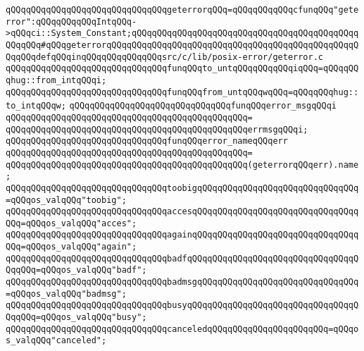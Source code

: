 \verb|qQQqqQQqqQQqqQQqqQQqqQQqqQQqqQQqgeterrorqQQq=qQQqqQQqqQQqcfunqQQq"geterror":qQQqqQQqqQQqIntqQQq->qQQqci::System_Constant;qQQqqQQqqQQqqQQqqQQqqQQqqQQqqQQqqQQqqQQqqQQqqQQqqQQq#qQQqgeterrorqQQqqQQqqQQqqQQqqQQqqQQqqQQqqQQqqQQqqQQqqQQqqQQqqQQqqQQqdefqQQqinqQQqqQQqqQQqqQQqsrc/c/lib/posix-error/geterror.c|\newline
\newline
\verb|qQQqqQQqqQQqqQQqqQQqqQQqqQQqqQQqfunqQQqto_untqQQqqQQqqQQqiqQQq=qQQqqQQqhug::from_intqQQqi;|\newline
\verb|qQQqqQQqqQQqqQQqqQQqqQQqqQQqqQQqfunqQQqfrom_untqQQqwqQQq=qQQqqQQqhug::to_intqQQqw;|\newline
\newline
\newline
\verb|qQQqqQQqqQQqqQQqqQQqqQQqqQQqqQQqfunqQQqerror_msgqQQqi|\newline
\verb|qQQqqQQqqQQqqQQqqQQqqQQqqQQqqQQqqQQqqQQqqQQqqQQq=|\newline
\verb|qQQqqQQqqQQqqQQqqQQqqQQqqQQqqQQqqQQqqQQqqQQqqQQqerrmsgqQQqi;|\newline
\newline
\newline
\verb|qQQqqQQqqQQqqQQqqQQqqQQqqQQqqQQqfunqQQqerror_nameqQQqerr|\newline
\verb|qQQqqQQqqQQqqQQqqQQqqQQqqQQqqQQqqQQqqQQqqQQqqQQq=|\newline
\verb|qQQqqQQqqQQqqQQqqQQqqQQqqQQqqQQqqQQqqQQqqQQqqQQq(geterrorqQQqerr).name;|\newline
\newline
\newline
\verb|qQQqqQQqqQQqqQQqqQQqqQQqqQQqqQQqtoobigqQQqqQQqqQQqqQQqqQQqqQQqqQQqqQQq=qQQqos_valqQQq"toobig";|\newline
\verb|qQQqqQQqqQQqqQQqqQQqqQQqqQQqqQQqaccesqQQqqQQqqQQqqQQqqQQqqQQqqQQqqQQqqQQq=qQQqos_valqQQq"acces";|\newline
\verb|qQQqqQQqqQQqqQQqqQQqqQQqqQQqqQQqagainqQQqqQQqqQQqqQQqqQQqqQQqqQQqqQQqqQQq=qQQqos_valqQQq"again";|\newline
\verb|qQQqqQQqqQQqqQQqqQQqqQQqqQQqqQQqbadfqQQqqQQqqQQqqQQqqQQqqQQqqQQqqQQqqQQqqQQq=qQQqos_valqQQq"badf";|\newline
\verb|qQQqqQQqqQQqqQQqqQQqqQQqqQQqqQQqbadmsgqQQqqQQqqQQqqQQqqQQqqQQqqQQqqQQq=qQQqos_valqQQq"badmsg";|\newline
\verb|qQQqqQQqqQQqqQQqqQQqqQQqqQQqqQQqbusyqQQqqQQqqQQqqQQqqQQqqQQqqQQqqQQqqQQqqQQq=qQQqos_valqQQq"busy";|\newline
\verb|qQQqqQQqqQQqqQQqqQQqqQQqqQQqqQQqcanceledqQQqqQQqqQQqqQQqqQQqqQQq=qQQqos_valqQQq"canceled";|\newline
